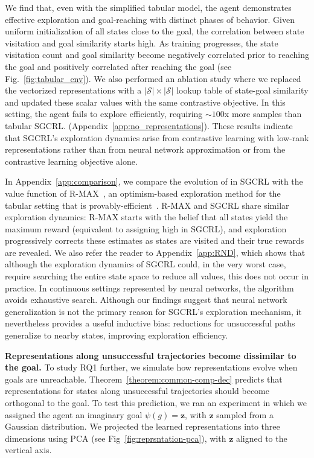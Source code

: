 \documentclass{article}
\begin{document}
We find that, even with the simplified tabular model, the agent demonstrates effective exploration and goal-reaching with distinct phases of behavior. Given uniform initialization of all states close to the goal, the correlation between state visitation and goal similarity starts high. As training progresses, the state visitation count and goal similarity become negatively correlated prior to reaching the goal and positively correlated after reaching the goal (see Fig.~\ref{fig:tabular_env}). We also performed an ablation study where we replaced the vectorized representations with a $|\mathcal{S}|\times|\mathcal{S}|$ lookup table of state-goal similarity and updated these scalar values with the same contrastive objective. In this setting, the agent fails to explore efficiently, requiring $\sim100$x more samples than tabular SGCRL. (Appendix~\ref{app:no_representations}). These results indicate that SGCRL's exploration dynamics arise from contrastive learning with low-rank representations rather than from neural network approximation or from the contrastive learning objective alone.

In Appendix~\ref{app:comparison}, we compare the evolution of \psisim in SGCRL with the value function of R-MAX~\citep{brafman2002r}, an optimism-based exploration method for the tabular setting that is provably-efficient~\citep{strehl2009reinforcement}. R-MAX and SGCRL share similar exploration dynamics: R-MAX starts with the belief that all states yield the maximum reward (equivalent to assigning high \psisim in SGCRL), and exploration progressively corrects these estimates as states are visited and their true rewards are revealed. We also refer the reader to Appendix~\ref{app:RND}, which shows that although the exploration dynamics of SGCRL could, in the very worst case, require searching the entire state space to reduce all \psisim values, this does not occur in practice. In continuous settings represented by neural networks, the algorithm avoids exhaustive search. Although our findings suggest that neural network generalization is not the primary reason for SGCRL's exploration mechanism, it nevertheless provides a useful inductive bias:  \psisim reductions for unsuccessful paths generalize to nearby states, improving exploration efficiency.

\textbf{Representations along unsuccessful trajectories become dissimilar to the goal.} \label{par:imaginary-goal}
To study RQ1 further, we simulate how representations evolve when goals are unreachable. Theorem~\ref{theorem:common-comp-dec} predicts that representations for states along unsuccessful trajectories should become orthogonal to the goal. To test this prediction, we ran an experiment in which we assigned the agent an imaginary goal $\psi(g) = \mathbf{z}$, with $\mathbf{z}$ sampled from a Gaussian distribution. We projected the learned representations into three dimensions using PCA (see Fig~\ref{fig:reprsntation-pca}), 
with $\mathbf{z}$ aligned to the vertical axis. 
\end{document}
